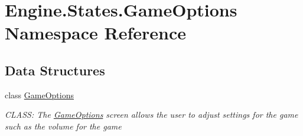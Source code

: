 \hypertarget{a00278}{}\section{Engine.\+States.\+Game\+Options Namespace Reference}
\label{a00278}
\subsection*{Data Structures}
\begin{DoxyCompactItemize}
\item 
class \hyperlink{a00558}{Game\+Options}
\begin{DoxyCompactList}\small\item\em C\+L\+A\+SS\+: The \hyperlink{a00558}{Game\+Options} screen allows the user to adjust settings for the game such as the volume for the game \end{DoxyCompactList}\end{DoxyCompactItemize}
